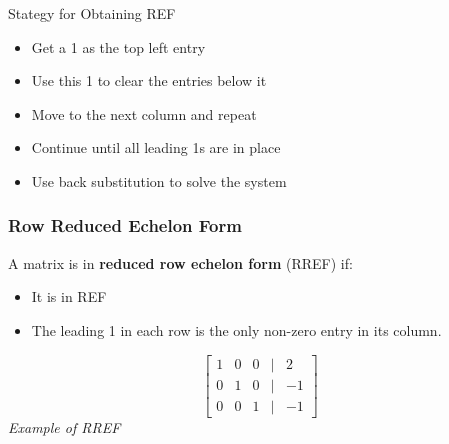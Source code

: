 \documentclass[a4paper, 9pt]{extarticle}
\begin{document}
\begin{conceptbox}{Stategy for Obtaining REF}{}
  \begin{itemize}
    \item Get a 1 as the top left entry
    \item Use this 1 to clear the entries below it
    \item Move to the next column and repeat
    \item Continue until all leading 1s are in place
    \item Use back substitution to solve the system
  \end{itemize}
\end{conceptbox}
\subsubsection{Row Reduced Echelon Form}
\begin{minipage}{0.8\textwidth}
  A matrix is in \textbf{reduced row echelon form} (RREF) if:
  \begin{itemize}
    \item It is in REF
    \item The leading 1 in each row is the only non-zero entry in its column.
  \end{itemize}
\end{minipage}
\begin{minipage}{0.2\textwidth}
  \begin{center}
    $$
      \begin{bmatrix}
        1 & 0 & 0 & | & 2  \\
        0 & 1 & 0 & | & -1 \\
        0 & 0 & 1 & | & -1
      \end{bmatrix}
    $$
    \emph{Example of RREF}
  \end{center}
\end{minipage}
\end{document}
